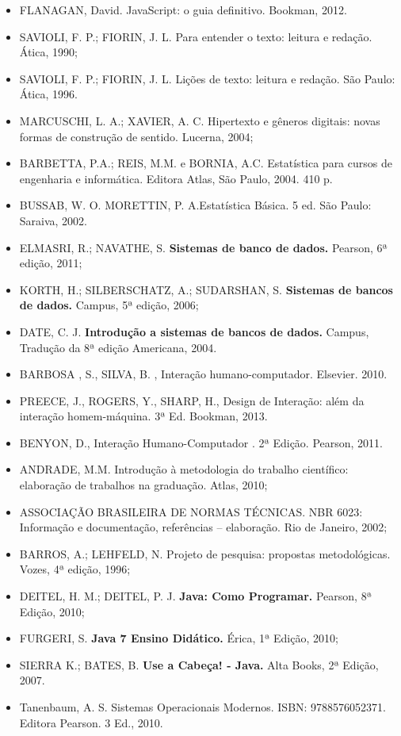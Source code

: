 \begin{itemize}
    \item FLANAGAN, David.
          JavaScript: o guia definitivo.
          Bookman, 2012.
    \item SAVIOLI, F. P.; FIORIN, J. L.  Para entender o texto: leitura e redação. Ática, 1990;  
  	\item SAVIOLI, F. P.; FIORIN, J. L. Lições de texto: leitura e redação. São Paulo: Ática, 1996. 
  	\item MARCUSCHI, L. A.; XAVIER, A. C. Hipertexto e gêneros digitais: novas formas de construção de sentido. Lucerna, 2004;
	\item BARBETTA, P.A.; REIS, M.M. e BORNIA, A.C. Estatística para cursos de engenharia e informática. Editora Atlas, São Paulo, 2004. 410 p.
	\item BUSSAB, W. O. MORETTIN, P. A.Estatística Básica.  5 ed.  São Paulo: Saraiva, 2002.
	\item 	ELMASRI, R.; NAVATHE, S. \textbf{Sistemas de banco de dados.} Pearson, 6ª edição, 2011;
	\item 	KORTH, H.; SILBERSCHATZ, A.; SUDARSHAN, S. \textbf{Sistemas de bancos de dados.} Campus, 5ª edição, 2006;
	\item 	DATE, C. J. \textbf{Introdução a sistemas de bancos de dados.} Campus, Tradução da 8ª edição Americana, 2004.
	\item BARBOSA , S., SILVA, B. , Interação humano-computador. Elsevier. 2010.
	\item PREECE, J., ROGERS, Y., SHARP, H., Design de Interação: além da interação homem-máquina. 3ª Ed. Bookman, 2013.
	\item BENYON, D., Interação Humano-Computador . 2ª Edição. Pearson, 2011.
    \item ANDRADE, M.M. Introdução à metodologia do trabalho científico: elaboração de trabalhos na graduação. Atlas, 2010; 
    \item ASSOCIAÇÃO BRASILEIRA DE NORMAS TÉCNICAS. NBR 6023: Informação e documentação, referências – elaboração. Rio de Janeiro, 2002;    
    \item BARROS, A.; LEHFELD, N. Projeto de pesquisa: propostas metodológicas. Vozes, 4ª edição, 1996;
	\item DEITEL, H. M.; DEITEL, P. J. \textbf{Java: Como Programar.} Pearson, 8ª Edição, 2010;
	\item FURGERI, S. \textbf{Java 7 Ensino Didático.} Érica, 1ª Edição, 2010;
	\item SIERRA K.; BATES, B. \textbf{Use a Cabeça! - Java.} Alta Books, 2ª Edição, 2007.
	\item Tanenbaum, A. S. Sistemas Operacionais Modernos. ISBN: 9788576052371. Editora Pearson. 3 Ed., 2010. 

\end{itemize}

